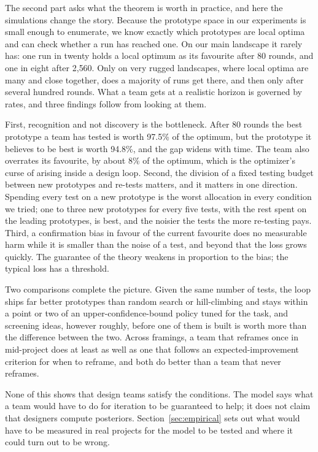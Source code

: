\documentclass[10pt,twocolumn]{article}
\theoremstyle{definition}
\begin{document}
The second part asks what the theorem is worth in practice, and here the simulations change the story. Because the prototype space in our experiments is small enough to enumerate, we know exactly which prototypes are local optima and can check whether a run has reached one. On our main landscape it rarely has: one run in twenty holds a local optimum as its favourite after 80 rounds, and one in eight after 2{,}560. Only on very rugged landscapes, where local optima are many and close together, does a majority of runs get there, and then only after several hundred rounds. What a team gets at a realistic horizon is governed by rates, and three findings follow from looking at them.

First, recognition and not discovery is the bottleneck. After 80 rounds the best prototype a team has tested is worth 97.5\% of the optimum, but the prototype it believes to be best is worth 94.8\%, and the gap widens with time. The team also overrates its favourite, by about 8\% of the optimum, which is the optimizer's curse of \citet{smithwinkler2006} arising inside a design loop. Second, the division of a fixed testing budget between new prototypes and re-tests matters, and it matters in one direction. Spending every test on a new prototype is the worst allocation in every condition we tried; one to three new prototypes for every five tests, with the rest spent on the leading prototypes, is best, and the noisier the tests the more re-testing pays. Third, a confirmation bias in favour of the current favourite does no measurable harm while it is smaller than the noise of a test, and beyond that the loss grows quickly. The guarantee of the theory weakens in proportion to the bias; the typical loss has a threshold.

Two comparisons complete the picture. Given the same number of tests, the loop ships far better prototypes than random search or hill-climbing and stays within a point or two of an upper-confidence-bound policy tuned for the task, and screening ideas, however roughly, before one of them is built is worth more than the difference between the two. Across framings, a team that reframes once in mid-project does at least as well as one that follows an expected-improvement criterion for when to reframe, and both do better than a team that never reframes.

None of this shows that design teams satisfy the conditions. The model says what a team would have to do for iteration to be guaranteed to help; it does not claim that designers compute posteriors. Section~\ref{sec:empirical} sets out what would have to be measured in real projects for the model to be tested and where it could turn out to be wrong.
\end{document}
